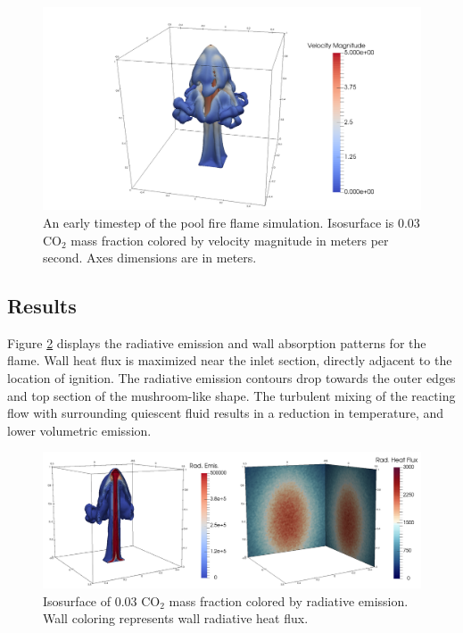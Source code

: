 \begin{figure}
\includegraphics[width=\linewidth]{figures/ch4/contour_early.png}
\caption{An early timestep of the pool fire flame simulation. Isosurface is 0.03 CO$_2$ mass fraction colored by velocity magnitude in meters per second. Axes dimensions are in meters.}
\label{fig:PoolFire_diagram}
\end{figure}

\subsection{Results}
Figure \ref{fig:PoolFire_radiationcontours} displays the radiative emission and wall absorption patterns for the flame. Wall heat flux is maximized near the inlet section, directly adjacent to the location of ignition. 
The radiative emission contours drop towards the outer edges and top section of the mushroom-like shape. The turbulent mixing of the reacting flow with surrounding quiescent fluid results in a reduction in temperature, and lower volumetric emission.  

\begin{figure}
\includegraphics[width=\linewidth]{figures/ch4/radiation_contours.png}
\caption{Isosurface of 0.03 CO$_2$ mass fraction colored by radiative emission. Wall coloring represents wall radiative heat flux.}
\label{fig:PoolFire_radiationcontours}
\end{figure}

